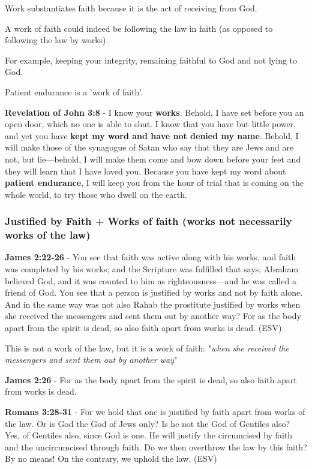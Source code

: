 \documentclass[11pt]{article}
\begin{document}
Work substantiates faith because it is the act of receiving from God.

A work of faith could indeed be following the law in faith (as opposed to following the law by works).

For example, keeping your integrity, remaining faithful to God and not lying to God.

Patient endurance is a 'work of faith'.

\textbf{Revelation of John 3:8} - I know your \textbf{works}. Behold, I have set before you an open door, which no one is able to shut. I know that you have but little power, and yet you have \textbf{kept my word and have not denied my name}.  Behold, I will make those of the synagogue of Satan who say that they are Jews and are not, but lie—behold, I will make them come and bow down before your feet and they will learn that I have loved you.  Because you have kept my word about \textbf{patient endurance}, I will keep you from the hour of trial that is coming on the whole world, to try those who dwell on the earth.

\subsubsection{Justified by Faith + Works of faith (works not necessarily works of the law)}
\label{sec:orgd4c3595}
\textbf{James 2:22-26} - You see that faith was active along with his works, and faith was completed by his works; and the Scripture was fulfilled that says, Abraham believed God, and it was counted to him as righteousness—and he was called a friend of God. You see that a person is justified by works and not by faith alone. And in the same way was not also Rahab the prostitute justified by works when she received the messengers and sent them out by another way? For as the body apart from the spirit is dead, so also faith apart from works is dead. (ESV)

This is not a work of the law, but it is a work of faith: "\emph{when she received the messengers and sent them out by another way}"

\textbf{James 2:26} - For as the body apart from the spirit is dead, so also faith apart from works is dead.

\textbf{Romans 3:28-31} - For we hold that one is justified by faith apart from works of the law. Or is God the God of Jews only? Is he not the God of Gentiles also? Yes, of Gentiles also, since God is one. He will justify the circumcised by faith and the uncircumcised through faith. Do we then overthrow the law by this faith? By no means! On the contrary, we uphold the law. (ESV)
\end{document}

